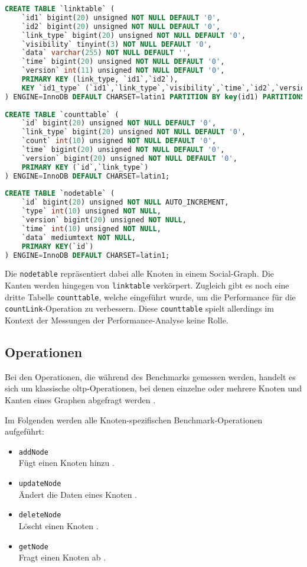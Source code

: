 \begin{lstlisting}[caption={Linkbench MySQL-Schema},language=SQL,label=src:linkbench_mysql]
CREATE TABLE `linktable` (
    `id1` bigint(20) unsigned NOT NULL DEFAULT '0',
    `id2` bigint(20) unsigned NOT NULL DEFAULT '0',
    `link_type` bigint(20) unsigned NOT NULL DEFAULT '0',
    `visibility` tinyint(3) NOT NULL DEFAULT '0',
    `data` varchar(255) NOT NULL DEFAULT '',
    `time` bigint(20) unsigned NOT NULL DEFAULT '0',
    `version` int(11) unsigned NOT NULL DEFAULT '0',
    PRIMARY KEY (link_type, `id1`,`id2`),
    KEY `id1_type` (`id1`,`link_type`,`visibility`,`time`,`id2`,`version`,`data`)
) ENGINE=InnoDB DEFAULT CHARSET=latin1 PARTITION BY key(id1) PARTITIONS 16;
    
CREATE TABLE `counttable` (
    `id` bigint(20) unsigned NOT NULL DEFAULT '0',
    `link_type` bigint(20) unsigned NOT NULL DEFAULT '0',
    `count` int(10) unsigned NOT NULL DEFAULT '0',
    `time` bigint(20) unsigned NOT NULL DEFAULT '0',
    `version` bigint(20) unsigned NOT NULL DEFAULT '0',
    PRIMARY KEY (`id`,`link_type`)
) ENGINE=InnoDB DEFAULT CHARSET=latin1;
    
CREATE TABLE `nodetable` (
    `id` bigint(20) unsigned NOT NULL AUTO_INCREMENT,
    `type` int(10) unsigned NOT NULL,
    `version` bigint(20) unsigned NOT NULL,
    `time` int(10) unsigned NOT NULL,
    `data` mediumtext NOT NULL,
    PRIMARY KEY(`id`)
) ENGINE=InnoDB DEFAULT CHARSET=latin1;
\end{lstlisting}
Die \texttt{nodetable} repräsentiert dabei alle Knoten in einem Social-Graph. Die Kanten werden hingegen von \texttt{linktable} verkörpert. Zugleich gibt es noch eine dritte Tabelle \texttt{counttable}, welche eingeführt wurde, um die Performance für die \texttt{countLink}-Operation zu verbessern. Diese \texttt{counttable} spielt allerdings im Kontext der Messungen der Performance-Analyse keine Rolle.

\subsection{Operationen}
\label{linkbench:operationen}
Bei den Operationen, die während des Benchmarks gemessen werden, handelt es sich um klassische \acs{oltp}-Operationen, bei denen einzelne oder mehrere Knoten und Kanten eines Graphen abgefragt werden \cite{snb_paper}. 

Im Folgenden werden alle Knoten-spezifischen Benchmark-Operationen aufgeführt:
\begin{itemize}
    \item \texttt{addNode}\\
    Fügt einen Knoten hinzu \cite{fb_linkbench_github}.
    \item \texttt{updateNode}\\
    Ändert die Daten eines Knoten \cite{fb_linkbench_github}.
    \item \texttt{deleteNode}\\
    Löscht einen Knoten \cite{fb_linkbench_github}.
    \item \texttt{getNode}\\
    Fragt einen Knoten ab \cite{fb_linkbench_github}.
\end{itemize}

